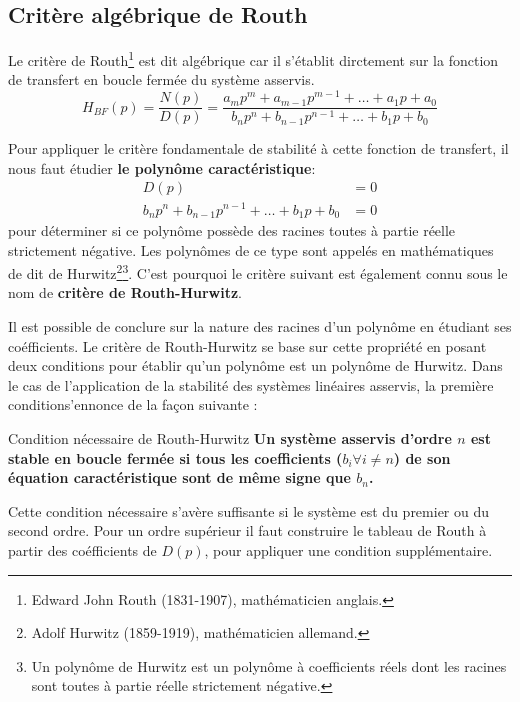 \subsection{Critère algébrique de Routh}

Le critère de Routh\footnote{Edward John Routh (1831-1907), mathématicien anglais.}
est dit algébrique car il s'établit dirctement sur la fonction de transfert en 
boucle fermée du système asservis. 
$$
H_{BF}(p)=\dfrac{N(p)}{D(p)}=\dfrac{a_mp^m+a_{m-1}p^{m-1}+\ldots+a_1p+a_0}{b_np^n+b_{n-1}p^{n-1}+\ldots+b_1p+b_0}
$$

Pour appliquer le critère fondamentale de stabilité à cette fonction de transfert,
il nous faut étudier \textbf{le polynôme caractéristique}:
\begin{align}
    D(p)&=0 \nonumber\\
    b_np^n+b_{n-1}p^{n-1}+\ldots+b_1p+b_0 &= 0
\end{align}
pour déterminer si ce polynôme possède des racines toutes à partie réelle 
strictement négative. Les polynômes de ce type sont appelés en mathématiques 
de dit de Hurwitz\footnote{Adolf Hurwitz (1859-1919), mathématicien allemand.}\footnote{Un polynôme de Hurwitz est un polynôme à coefficients 
réels dont les racines sont toutes à partie réelle strictement négative.}.
C'est pourquoi le critère suivant est également connu sous le nom de \textbf{critère de Routh-Hurwitz}.

Il est possible de conclure sur la nature des racines d'un polynôme 
en étudiant ses coéfficients. Le critère de Routh-Hurwitz se base sur cette propriété en 
posant deux conditions pour établir qu'un polynôme est un polynôme de Hurwitz.
Dans le cas de l'application de la stabilité des systèmes linéaires asservis, la première conditions'ennonce 
de la façon suivante :
\begin{criteria}{Condition nécessaire de Routh-Hurwitz }
    \textbf{Un système asservis d'ordre $n$ est stable en boucle fermée 
    si tous les coefficients ($b_i\forall i\neq n$) de son équation caractéristique 
    sont de même signe que $b_n$.}
\end{criteria}

Cette condition nécessaire s'avère suffisante si le système est du premier ou du second ordre.
Pour un ordre supérieur il faut construire le tableau de Routh à partir des coéfficients de $D(p)$,
pour appliquer une condition supplémentaire. 

